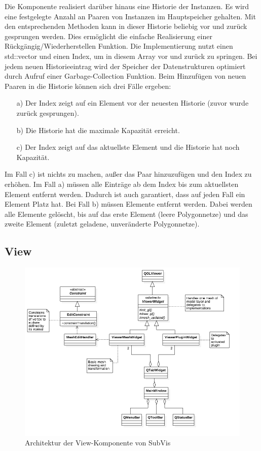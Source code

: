 Die Komponente realisiert darüber hinaus eine Historie der Instanzen.
Es wird eine festgelegte Anzahl an Paaren von Instanzen im Hauptspeicher gehalten.
Mit den entsprechenden Methoden kann in dieser Historie beliebig vor und zurück gesprungen werden.
Dies ermöglicht die einfache Realisierung einer Rückgängig/Wiederherstellen Funktion.
Die Implementierung nutzt einen std::vector und einen Index, um in diesem Array vor und zurück zu springen.
Bei jedem neuen Historieeintrag wird der Speicher der Datenstrukturen optimiert durch Aufruf einer Garbage-Collection Funktion.
Beim Hinzufügen von neuen Paaren in die Historie können sich drei Fälle ergeben:

\begin{itemize}
\item[a)] Der Index zeigt auf ein Element vor der neuesten Historie (zuvor wurde zurück gesprungen).
\item[b)] Die Historie hat die maximale Kapazität erreicht.
\item[c)] Der Index zeigt auf das aktuellste Element und die Historie hat noch Kapazität.
\end{itemize}

Im Fall c) ist nichts zu machen, außer das Paar hinzuzufügen und den Index zu erhöhen.
Im Fall a) müssen alle Einträge ab dem Index bis zum aktuellsten Element entfernt werden. 
Dadurch ist auch garantiert, dass auf jeden Fall ein Element Platz hat.
Bei Fall b) müssen Elemente entfernt werden. 
Dabei werden alle Elemente gelöscht, bis auf das erste Element (leere Polygonnetze) und das zweite Element (zuletzt geladene, unveränderte Polygonnetze).
 

\subsection{View}

\begin{figure}
  \centering
  \includegraphics[width=\textwidth]{content/media/subvis_architektur_view.png}
  \caption{Architektur der View-Komponente von SubVis}
  \label{fig:subvis_architektur_view}
\end{figure}

